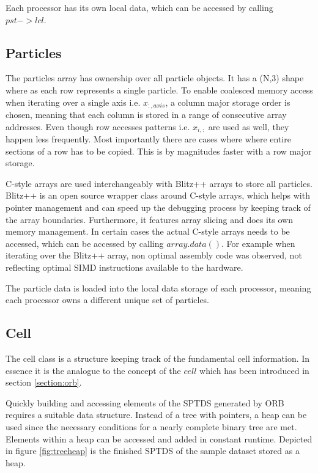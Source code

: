 \documentclass[]{article}
\begin{document}
Each processor has its own local data, which can be accessed by calling $pst->lcl$. 

\subsection{Particles}

The particles array has ownership over all particle objects. It has a (N,3) shape where as each row represents a single particle. To enable coalesced memory access when iterating over a single axis i.e. $x_{:, axis}$, a column major storage order is chosen, meaning that each column is stored in a range of consecutive array addresses. Even though row accesses patterns i.e. $x_{i,:}$ are used as well, they happen less frequently. Most importantly there are cases where where entire sections of a row has to be copied. This is by magnitudes faster with a row major storage.

C-style arrays are used interchangeably with Blitz++ arrays to store all particles. Blitz++ is an open source wrapper class around C-style arrays, which helps with pointer management and can speed up the debugging process by keeping track of the array boundaries. Furthermore, it features array slicing and does its own memory management. In certain cases the actual C-style arrays needs to be accessed, which can be accessed by calling $array.data()$. For example when iterating over the Blitz++ array, non optimal assembly code was observed, not reflecting optimal SIMD instructions available to the hardware. 

The particle data is loaded into the local data storage of each processor, meaning each processor owns a different unique set of particles.

\subsection{Cell}

The cell class is a structure keeping track of the fundamental cell information. In essence it is the analogue to the concept of the $cell$ which has been introduced in section \ref{section:orb}.

Quickly building and accessing elements of the SPTDS generated by ORB requires a suitable data structure. Instead of a tree with pointers, a heap can be used since the necessary conditions for a nearly complete binary tree are met. Elements within a heap can be accessed and added in constant runtime. Depicted in figure \ref{fig:treeheap} is the finished SPTDS of the sample dataset stored as a heap.
\end{document}
